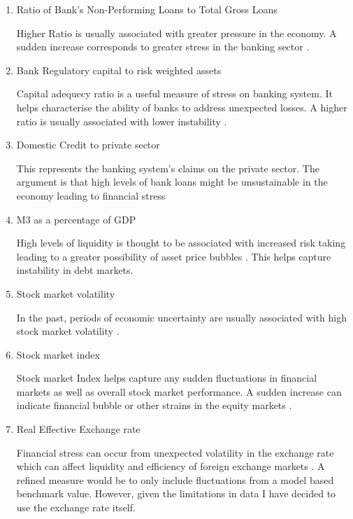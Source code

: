 \documentclass[12pt]{article}
\begin{document}
\begin{enumerate}
  \item  Ratio of Bank's Non-Performing Loans to Total Gross Loans

Higher Ratio is usually associated with greater pressure in the economy. A sudden increase corresponds to greater stress in the banking sector \citep{RN36}.

   \item  Bank Regulatory capital to risk weighted assets

Capital adequecy ratio is a useful measure of stress on banking system. It helps characterise the ability of banks to address unexpected losses. A higher ratio is usually associated with lower instability \citep{RN36}.

   \item  Domestic Credit to private sector

This represents the banking system's claims on the private sector. The argument is that high levels of bank loans might be unsustainable in the economy leading to financial stress \citep{RN4}

   \item  M3 as a percentage of GDP

High levels of liquidity is thought to be associated with increased risk taking leading to a greater possibility of asset price bubbles \citep{RN4}. This helps capture instability in debt markets.

   \item  Stock market volatility

In the past, periods of economic uncertainty are usually associated with high stock market volatility \citep{RN18}.

   \item  Stock market index

Stock market Index helps capture any sudden fluctuations in financial markets as well as overall stock market performance. A sudden increase can indicate financial bubble or other strains in the equity markets \citep{RN4}.

   \item  Real Effective Exchange rate

Financial stress can occur from unexpected volatility in the exchange rate which can affect liquidity and efficiency of foreign exchange markets \citep{RN20}. A refined measure would be to only include fluctuations from a model based benchmark value. However, given the limitations in data I have decided to use the exchange rate itself.
\end{enumerate}
\end{document}
